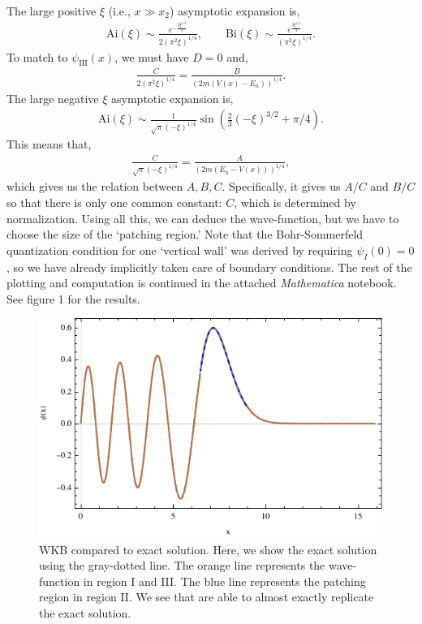 \documentclass[10pt]{article}
\newcommand{\1}{\mathbf 1}
\begin{document}
The large positive $\xi$ (i.e., $x \gg x_2$) asymptotic expansion is,
\begin{align}
	\mathrm{Ai}(\xi)
	\sim
	\frac{e^{-\frac{2 \xi ^{3/2}}{3}}}{2 (\pi^2 \xi)^{1/4}},
	\qquad
	\mathrm{Bi}(\xi)
	\sim
	\frac{e^{\frac{2 \xi ^{3/2}}{3}}}{(\pi^2\xi)^{1/4}}.
\end{align}
To match to $\psi_{\mathrm{III}}(x)$, we must have $D = 0$ and,
\begin{align}
	\frac{C}{2(\pi^2 \xi)^{1/4}}
	=
	\frac{B}{(2m(V(x)- E_n))^{1/4}}.
\end{align}
The large negative $\xi$ asymptotic expansion is,
\begin{align}
	\mathrm{Ai}(\xi)
	\sim 
	\frac{1}{\sqrt{\pi}(-\xi)^{1/4}}
	\sin(\frac{2}{3}(-\xi)^{3/2} + \pi/4).
\end{align}
This means that,
\begin{align}
	\frac{C}{\sqrt{\pi}(-\xi)^{1/4}}
	=
	\frac{A}{(2m(E_n - V(x)))^{1/4}},
\end{align}
which gives us the relation between $A,B,C$.
Specifically, it gives us $A/C$ and $B/C$ so that there is only one common constant: $C$, which is determined by normalization.
Using all this, we can deduce the wave-function, but we have to choose the size of the `patching region.'
Note that the Bohr-Sommerfeld quantization condition for one `vertical wall' was derived by requiring $\psi_I(0) = 0$, so we have already implicitly taken care of boundary conditions.
The rest of the plotting and computation is continued in the attached {\em Mathematica} notebook.
See figure 1 for the results.
\begin{figure}[h!]
	\centering
	\includegraphics[width=0.8\linewidth]{fig/plot.pdf}
	\caption{
		WKB compared to exact solution.
		Here, we show the exact solution using the gray-dotted line.
		The orange line represents the wave-function in region I and III.
		The blue line represents the patching region in region II.
		We see that are able to almost exactly replicate the exact solution.
	}
\end{figure}
\end{document}
